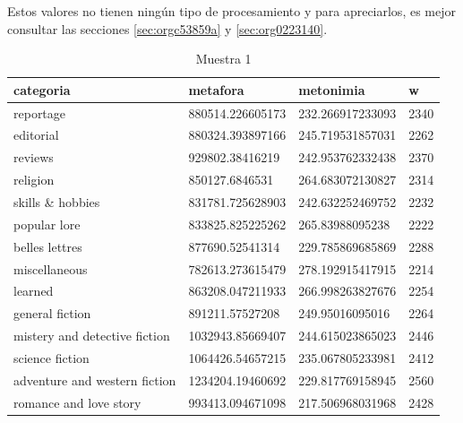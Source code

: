 \documentclass[12pt,letterpaper,twoside]{article}
\begin{document}
Estos valores no tienen ningún tipo de procesamiento y para apreciarlos, es mejor
consultar las secciones \ref{sec:orgc53859a} y \ref{sec:org0223140}.
\begin{center}
    \begin{longtable}{| p{} | p{} | p{}|p{}|}
    \caption{Muestra 1}
    \hline
        categoria & metafora & metonimia & w \\ \hline
        reportage & 880514.226605173 & 232.266917233093 & 2340 \\ \hline
        editorial & 880324.393897166 & 245.719531857031 & 2262 \\ \hline
        reviews & 929802.38416219 & 242.953762332438 & 2370 \\ \hline
        religion & 850127.6846531 & 264.683072130827 & 2314 \\ \hline
        skills \& hobbies & 831781.725628903 & 242.632252469752 & 2232 \\ \hline
        popular lore & 833825.825225262 & 265.83988095238 & 2222 \\ \hline
        belles lettres & 877690.52541314 & 229.785869685869 & 2288 \\ \hline
        miscellaneous & 782613.273615479 & 278.192915417915 & 2214 \\ \hline
        learned & 863208.047211933 & 266.998263827676 & 2254 \\ \hline
        general fiction & 891211.57527208 & 249.95016095016 & 2264 \\ \hline
        mistery and detective fiction & 1032943.85669407 & 244.615023865023 & 2446 \\ \hline
        science fiction & 1064426.54657215 & 235.067805233981 & 2412 \\ \hline
        adventure and western fiction & 1234204.19460692 & 229.817769158945 & 2560 \\ \hline
        romance and love story & 993413.094671098 & 217.506968031968 & 2428 \\ \hline
\end{longtable}
\label{muestra1}
\end{center}
\end{document}
